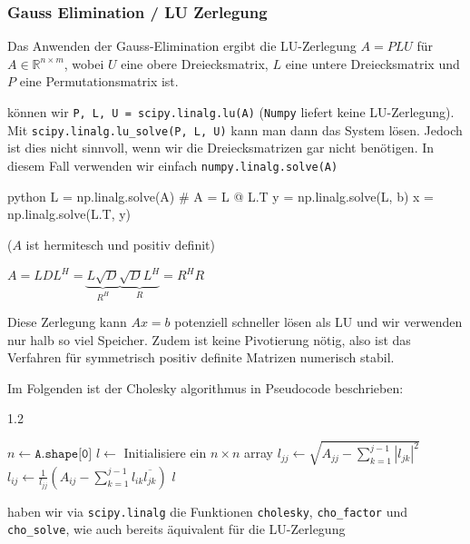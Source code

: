 \subsubsection{Gauss Elimination / LU Zerlegung}

Das Anwenden der Gauss-Elimination ergibt die LU-Zerlegung $A = PLU$ für $A \in \mathbb{R}^{n \times m}$,
wobei $U$ eine obere Dreiecksmatrix, $L$ eine untere Dreiecksmatrix
und $P$ eine Permutationsmatrix ist.

\innumpy können wir \texttt{P, L, U = scipy.linalg.lu(A)} (\texttt{Numpy} liefert keine LU-Zerlegung). Mit \texttt{scipy.linalg.lu\_solve(P, L, U)} kann man dann das System lösen.
Jedoch ist dies nicht sinnvoll, wenn wir die Dreiecksmatrizen gar nicht benötigen. In diesem Fall verwenden wir einfach \texttt{numpy.linalg.solve(A)}

\begin{code}{python}
    L = np.linalg.solve(A)      # A = L @ L.T
    y = np.linalg.solve(L, b)
    x = np.linalg.solve(L.T, y)
\end{code}


 ($A$ ist hermitesch und positiv definit)

$A = LDL^H = \underbrace{L\sqrt{D}}_{R^H}\underbrace{\sqrt{D}L^H}_{R} = R^H R$

Diese Zerlegung kann $Ax = b$ potenziell schneller lösen als LU und wir verwenden nur halb so viel Speicher.
Zudem ist keine Pivotierung nötig, also ist das Verfahren für symmetrisch positiv definite Matrizen numerisch stabil.

Im Folgenden ist der Cholesky algorithmus in Pseudocode beschrieben:
\begin{algorithm}
    \begin{spacing}{1.2}
        \caption{\textsc{cholesky}(A)}
        \begin{algorithmic}[1]
            \State $n \gets \texttt{A.shape[0]}$
            \State $l \gets$ Initialisiere ein $n \times n$ array
                \State $l_{jj} \gets \sqrt{A_{jj} - \sum_{k = 1}^{j - 1} |l_{jk}|^2}$
                    \State $l_{ij} \gets \displaystyle\frac{1}{l_{jj}} \left( A_{ij} - \sum_{k = 1}^{j - 1} l_{ik} \overline{l_{jk}} \right)$
                \EndFor
            \EndFor
            \State \Return $l$
        \end{algorithmic}
    \end{spacing}
\end{algorithm}

\innumpy haben wir via \texttt{scipy.linalg} die Funktionen \texttt{cholesky}, \texttt{cho\_factor} und \texttt{cho\_solve}, wie auch bereits äquivalent für die LU-Zerlegung
